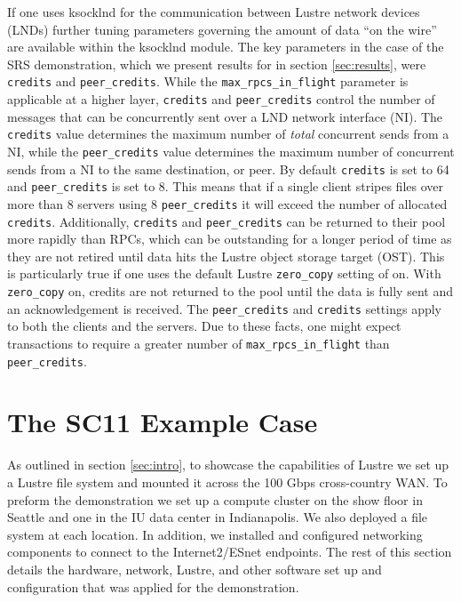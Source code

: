 \documentclass[]{sigplan-proc}
\begin{document}
If one uses ksocklnd for the communication between Lustre network devices (LNDs) further tuning parameters
governing the amount of data ``on the wire'' are available within the ksocklnd module. The key parameters in
the case of the SRS demonstration, which we present results for in section \ref{sec:results}, were 
{\tt credits} and {\tt peer\_credits}. While the {\tt max\_rpcs\_in\_flight} parameter is applicable at a higher
layer, {\tt credits} and {\tt peer\_credits} control the number of messages that can be concurrently sent over
a LND network interface (NI). The {\tt credits} value determines the maximum number of {\it total} concurrent
sends from a NI, while the {\tt peer\_credits} value determines the maximum number of concurrent sends from a
NI to the same destination, or peer. By default {\tt credits} is set to 64 and {\tt peer\_credits} is set to
8. This means that if a single client stripes files over more than 8 servers using 8 {\tt peer\_credits} it
will exceed the number of allocated {\tt credits}. Additionally, {\tt credits} and {\tt peer\_credits} can be
returned to their pool more rapidly than RPCs, which can be outstanding for a longer period of time as they are not
retired until data hits the Lustre object storage target (OST). This is particularly true if one uses the
default Lustre {\tt zero\_copy} setting of on. With {\tt zero\_copy} on, credits are not returned to the pool
until the data is fully sent and an acknowledgement is received. The {\tt peer\_credits} and {\tt credits}
settings apply to both the clients and the servers. Due to these facts, one might expect
transactions to require a greater number of {\tt max\_rpcs\_in\_flight} than {\tt peer\_credits}.
 

\section {The SC11 Example Case}\label{sec:usecase}

As outlined in section \ref{sec:intro}, to showcase the capabilities of Lustre we set up a Lustre
file system and mounted it across the 100 Gbps cross-country WAN. To preform the demonstration we set up a
compute cluster on the show floor in Seattle and one in the IU data center in Indianapolis. We also deployed a
file system at each location. In addition, we installed and configured networking components to connect to the
Internet2/ESnet endpoints. The rest of this section details the hardware, network, Lustre, and other software
set up and configuration that was applied for the demonstration.
\end{document}
